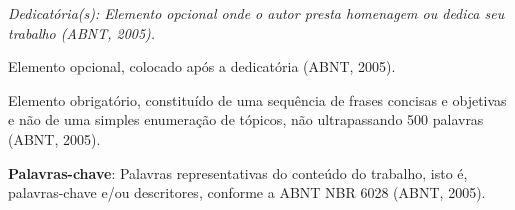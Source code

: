 \cleardoublepage
\thispagestyle{empty}
\vspace*{200mm}

\begin{flushright}
{\em
Dedicatória(s): Elemento opcional onde o autor presta homenagem ou dedica seu trabalho (ABNT, 2005).
}
\end{flushright}
\newpage


\hspace{5mm}
Elemento opcional, colocado após a dedicatória (ABNT, 2005). 

\begin{resumo}

Elemento obrigatório, constituído de uma sequência de frases concisas e objetivas e não de uma simples enumeração de tópicos, não ultrapassando 500 palavras (ABNT, 2005).

{\hspace{-8mm} \bf{Palavras-chave}}: Palavras representativas do conteúdo do trabalho, isto é, palavras-chave e/ou descritores, conforme a ABNT NBR 6028 (ABNT, 2005).

\end{resumo}

\begin{abstract}

Elemento obrigatório, em língua estrangeira, com as mesmas características do resumo em língua vernácula (ABNT, 2005).

{\hspace{-8mm} \bf{Keywords}}: Palavras representativas do conteúdo do trabalho, isto é, palavras-chave e/ou descritores, na língua (ABNT, 2005).

\end{abstract}

\listoffigures


